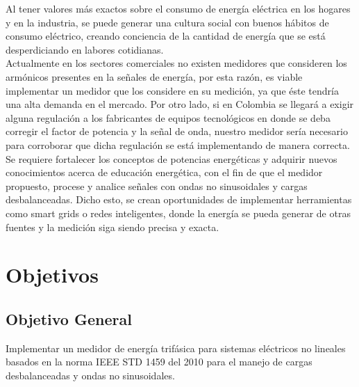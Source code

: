 Al tener valores más exactos sobre el consumo de energía eléctrica en los hogares y en la industria, se puede generar una cultura social con buenos hábitos de consumo eléctrico, creando conciencia de la cantidad de energía que se está desperdiciando en labores cotidianas.\\

Actualmente en los sectores comerciales no existen medidores que consideren los armónicos presentes en la señales de energía, por esta razón, es viable implementar un medidor que los considere en su medición, ya que éste tendría una alta demanda en el mercado. Por otro lado, si en Colombia se llegará a exigir alguna regulación a los fabricantes de equipos tecnológicos en donde se deba corregir el factor de potencia y la señal de onda, nuestro medidor sería necesario para corroborar que dicha regulación se está implementando de manera correcta. \\

Se requiere fortalecer los conceptos de potencias energéticas y adquirir nuevos conocimientos acerca de educación energética, con el fin de que el medidor propuesto, procese y analice señales con ondas no sinusoidales y cargas desbalanceadas. Dicho esto, se crean oportunidades de implementar herramientas como smart grids o redes inteligentes, donde la energía se pueda generar de otras fuentes y la medición siga siendo precisa y exacta.


\newpage{\clearpage}
\chapter{ Objetivos}
\section{Objetivo General}

Implementar un medidor de energía trifásica para sistemas eléctricos no lineales basados en la norma IEEE STD 1459 del 2010 para el manejo de cargas desbalanceadas y ondas no sinusoidales.

